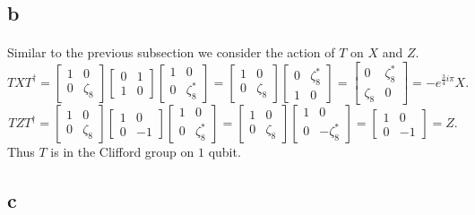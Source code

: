 \documentclass[letterpaper,12pt,oneside,onecolumn]{article}
\begin{document}
\subsection{b}
\paragraph{}
Similar to the previous subsection we consider the action of $T$ on $X$ and $Z$.
$$TXT^{\dagger} = \begin{bmatrix} 1 & 0 \\ 0& \zeta_8 \end{bmatrix}\begin{bmatrix} 0 & 1 \\ 1 & 0 \end{bmatrix}\begin{bmatrix} 1 & 0 \\ 0& \zeta_8^* \end{bmatrix} = \begin{bmatrix} 1 & 0 \\ 0& \zeta_8 \end{bmatrix}\begin{bmatrix} 0 & \zeta^*_8 \\ 1 & 0 \end{bmatrix} = \begin{bmatrix} 0 & \zeta_8^* \\ \zeta_8 & 0 \end{bmatrix} = -e^{\frac{3}{4}i\pi}X.$$
$$TZT^{\dagger} = \begin{bmatrix} 1 & 0 \\ 0& \zeta_8 \end{bmatrix}\begin{bmatrix} 1 & 0 \\ 0 & -1 \end{bmatrix}\begin{bmatrix} 1 & 0 \\ 0& \zeta_8^* \end{bmatrix} = \begin{bmatrix} 1 & 0 \\ 0& \zeta_8 \end{bmatrix}\begin{bmatrix} 1 & 0 \\ 0 & -\zeta^*_8\end{bmatrix} = \begin{bmatrix} 1 & 0 \\ 0 & -1\end{bmatrix} = Z.$$
Thus $T$ is in the Clifford group on $1$ qubit.
\subsection{c}
\end{document}
